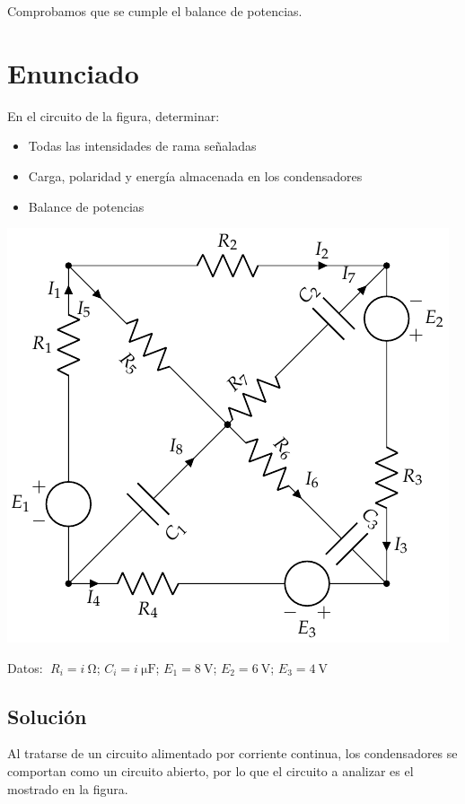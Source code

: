 Comprobamos que se cumple el balance de potencias.

\section{Enunciado}
En el circuito de la figura, determinar:
\begin{itemize}
\item Todas las intensidades de rama señaladas
\item Carga, polaridad y energía almacenada en los condensadores
\item Balance de potencias
\end{itemize}

\begin{center}
  \includegraphics{figuras/BT1_09.pdf}
\end{center}

  Datos: $ \; R_i = \qty[parse-numbers=false]{i}{\ohm}$; \; $C_i = \qty[parse-numbers=false]{i}{\micro\farad}$; \; $E_1 = \qty{8}{\volt}$; \; $E_2 = \qty{6}{\volt}$; \; $E_3 = \qty{4}{\volt}$

\subsection*{Solución}
Al tratarse de un circuito alimentado por corriente continua, los
condensadores se comportan como un circuito abierto, por lo que el
circuito a analizar es el mostrado en la figura.

